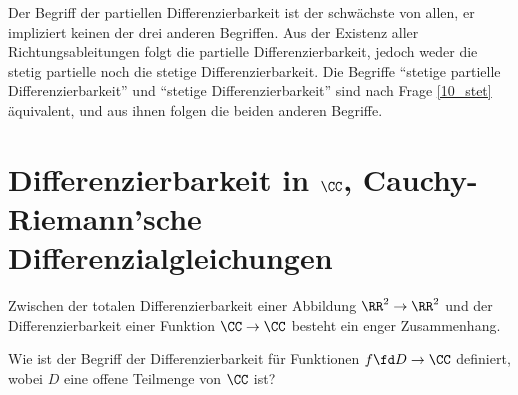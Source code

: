 \begin{antwort}
  Der Begriff der partiellen Differenzierbarkeit ist der schwächste 
  von allen, er impliziert keinen der drei anderen Begriffen. Aus der Existenz 
  aller Richtungsableitungen folgt die partielle Differenzierbarkeit, 
  jedoch weder die stetig partielle noch die stetige Differenzierbarkeit. 
  Die Begriffe "`stetige partielle Differenzierbarkeit"' und 
  "`stetige Differenzierbarkeit"' sind nach Frage \ref{10_stet} äquivalent, und 
  aus ihnen folgen die beiden anderen Begriffe.  
  \AntEnd
\end{antwort}




\section{Differenzierbarkeit in $\CC$, 
  Cauchy-Riemann'sche Differenzialgleichungen}

Zwischen der totalen Differenzierbarkeit einer Abbildung $\RR^2\to\RR^2$ und 
der Differenzierbarkeit einer Funktion $\CC\to\CC$ besteht ein enger 
Zusammenhang.

\begin{frage}
  Wie ist der Begriff der Differenzierbarkeit für 
   Funktionen $f\fd D\to \CC$ definiert, wobei 
  $D$ eine offene Teilmenge von $\CC$ ist?
\end{frage}

